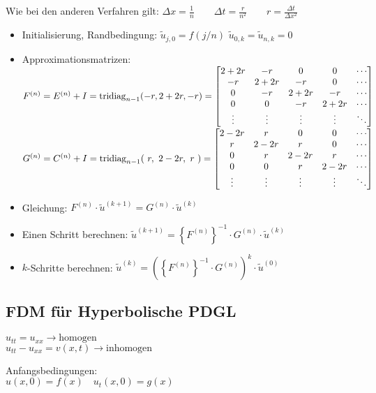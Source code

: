 Wie bei den anderen Verfahren gilt: $\Delta x=\frac{1}{n} \qquad \Delta t=\frac{r}{n^2} \qquad \boxed{r=\frac{\Delta
      t}{\Delta x^2}}$
\begin{itemize}
  \item Initialisierung, Randbedingung: $\tilde{u}_{j,0}=f(j/n)$ \qquad $\tilde{u}_{0,k}=\tilde{u}_{n,k}=0$
  \item Approximationsmatrizen:\\
        $F^{(n)}=E^{(n)}+I=\operatorname{tridiag}_{n-1}(-r,2+2r,-r)=\begin{bmatrix}
            2+2r   & -r     & 0      & 0      & \cdots \\
            -r     & 2+2r   & -r     & 0      & \cdots \\
            0      & -r     & 2+2r   & -r     & \cdots \\
            0      & 0      & -r     & 2+2r   & \cdots \\
            \vdots & \vdots & \vdots & \vdots & \ddots
          \end{bmatrix}$\\
        $G^{(n)}=C^{(n)}+I=\operatorname{tridiag}_{n-1}(~r,~2-2r,~r~)=\begin{bmatrix}
            2-2r   & r      & 0      & 0      & \cdots \\
            r      & 2-2r   & r      & 0      & \cdots \\
            0      & r      & 2-2r   & r      & \cdots \\
            0      & 0      & r      & 2-2r   & \cdots \\
            \vdots & \vdots & \vdots & \vdots & \ddots
          \end{bmatrix}$
  \item Gleichung: $F^{(n)} \cdot \tilde{u}^{(k+1)}=G^{(n)} \cdot \tilde{u}^{(k)}$
  \item Einen Schritt berechnen: $\tilde{u}^{(k+1)}=\left\{F^{(n)}\right\}^{-1} \cdot G^{(n)}\cdot \tilde{u}^{(k)}$
  \item $k$-Schritte berechnen: $\tilde{u}^{(k)}=\left(\left\{F^{(n)}\right\}^{-1} \cdot G^{(n)}\right)^{k}\cdot \tilde{u}^{(0)}$
\end{itemize}

\subsection{FDM für Hyperbolische PDGL}

\begin{minipage}{8cm}
  $u_{tt}=u_{xx} \rightarrow \text{homogen}$\\
  $u_{tt} -u_{xx}= v(x,t) \rightarrow \text{inhomogen}$
\end{minipage}
\begin{minipage}{5cm}
  Anfangsbedingungen:\\
  $u(x,0)=f(x) \quad u_t(x,0)=g(x)$
\end{minipage}\\

